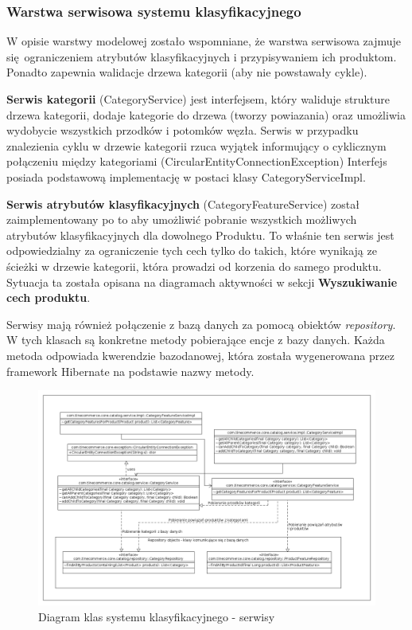 \subsubsection{Warstwa serwisowa systemu klasyfikacyjnego}
W opisie warstwy modelowej zostało wspomniane, że warstwa serwisowa zajmuje się ograniczeniem atrybutów klasyfikacyjnych i przypisywaniem ich produktom. Ponadto zapewnia walidacje drzewa kategorii (aby nie powstawały cykle).

\noindent
\textbf{Serwis kategorii} (CategoryService) jest interfejsem, który waliduje strukture drzewa kategorii, dodaje kategorie do drzewa (tworzy powiazania) oraz umożliwia wydobycie wszystkich przodków i potomków węzła. Serwis w przypadku znalezienia cyklu w drzewie kategorii rzuca wyjątek informujący o cyklicznym połączeniu między kategoriami (CircularEntityConnectionException) Interfejs posiada podstawową implementację w postaci klasy CategoryServiceImpl. 

\noindent
\textbf{Serwis atrybutów klasyfikacyjnych} (CategoryFeatureService) został zaimplementowany po to aby umożliwić pobranie wszystkich możliwych atrybutów klasyfikacyjnych dla dowolnego Produktu. To właśnie ten serwis jest odpowiedzialny za ograniczenie tych cech tylko do takich, które wynikają ze ścieżki w drzewie kategorii, która prowadzi od korzenia do samego produktu. Sytuacja ta została opisana na diagramach aktywności w sekcji \textbf{Wyszukiwanie cech produktu}.

Serwisy mają również połączenie z bazą danych za pomocą obiektów \textit{repository}. W tych klasach są konkretne metody pobierające encje z bazy danych. Każda metoda odpowiada kwerendzie bazodanowej, która została wygenerowana przez framework Hibernate na podstawie nazwy metody. 
\begin{figure}
	\begin{center}
		\includegraphics[scale=0.4,angle=270]{klasy_serwisy_sysKlas.png}
	\end{center}
	\caption{{\color{black}Diagram klas systemu klasyfikacyjnego - serwisy}} \label{klasy_serwisy_sysKlas}
\end{figure}

